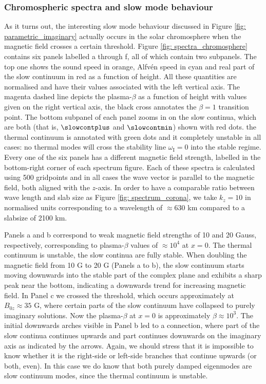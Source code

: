 \subsubsection{Chromospheric spectra and slow mode behaviour}
As it turns out, the interesting slow mode behaviour discussed in Figure \ref{fig: parametric_imaginary} actually occurs in the solar chromosphere when the magnetic field crosses a certain threshold. Figure \ref{fig: spectra_chromosphere} contains six panels labelled a through f, all of which contain two subpanels. The top one shows the sound speed in orange, Alfv\'en speed in cyan and real part of the slow continuum in red as a function of height. All these quantities are normalised and have their values associated with the left vertical axis. The magenta dashed line depicts the plasma-$\beta$ as a function of height with values given on the right vertical axis, the black cross annotates the $\beta = 1$ transition point. The bottom subpanel of each panel zooms in on the slow continua, which are both (that is, $\slowcontplus$ and $\slowcontmin$) shown with red dots. the thermal continuum is annotated with green dots and it completely unstable in all cases: no thermal modes will cross the stability line $\omega_\text{I} = 0$ into the stable regime. Every one of the six panels has a different magnetic field strength, labelled in the bottom-right corner of each spectrum figure. Each of these spectra is calculated using 500 gridpoints and in all cases the wave vector is parallel to the magnetic field, both aligned with the $z$-axis. In order to have a comparable ratio between wave length and slab size as Figure \ref{fig: spectrum_corona}, we take $k_z = 10$ in normalised units corresponding to a wavelength of $\approx 630$ km compared to a slabsize of 2100 km.

Panels a and b correspond to weak magnetic field strengths of 10 and 20 Gauss, respectively, corresponding to plasma-$\beta$ values of $\approx 10^4$ at $x = 0$. The thermal continuum is unstable, the slow continua are fully stable. When doubling the magnetic field from 10 G to 20 G (Panels a to b), the slow continuum starts moving downwards into the stable part of the complex plane and exhibits a sharp peak near the bottom, indicating a downwards trend for increasing magnetic field. In Panel c we crossed the threshold, which occurs approximately at $B_{0z} \approx 35$ G, where certain parts of the slow continuum have collapsed to purely imaginary solutions. Now the plasma-$\beta$ at $x=0$ is approximately $\beta \approx 10^3$. The initial downwards arches visible in Panel b led to a connection, where part of the slow continua continues upwards and part continues downwards on the imaginary axis as indicated by the arrows. Again, we should stress that it is impossible to know whether it is the right-side or left-side branches that continue upwards (or both, even). In this case we do know that both purely damped eigenmodes are slow continuum modes, since the thermal continuum is unstable.

